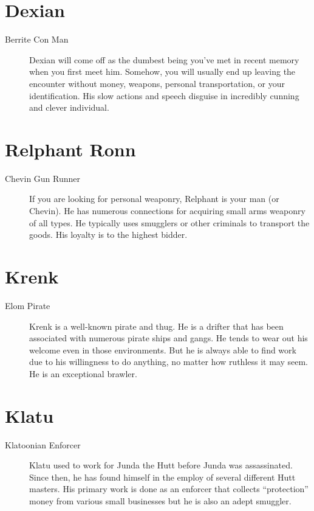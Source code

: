 \documentclass{article}
\begin{document}
\section{Dexian}
\begin{description}
	\item [Berrite \male Con Man] Dexian will come off as the dumbest being you’ve met in recent memory when you first meet him. Somehow, you will usually end up leaving the encounter without money, weapons, personal transportation, or your identification. His slow actions and speech disguise in incredibly cunning and clever individual.
\end{description}
\section{Relphant Ronn}
\begin{description}
	\item [Chevin \male Gun Runner] If you are looking for personal weaponry, Relphant is your man (or Chevin). He has numerous connections for acquiring small arms weaponry of all types. He typically uses smugglers or other criminals to transport the goods. His loyalty is to the highest bidder.
\end{description}
\section{Krenk}
\begin{description}
	\item [Elom \male Pirate] Krenk is a well-known pirate and thug. He is a drifter that has been associated with numerous pirate ships and gangs. He tends to wear out his welcome even in those environments. But he is always able to find work due to his willingness to do anything, no matter how ruthless it may seem. He is an exceptional brawler.
\end{description}
\section{Klatu}
\begin{description}
	\item [Klatoonian \male Enforcer] Klatu used to work for Junda the Hutt before Junda was assassinated. Since then, he has found himself in the employ of several different Hutt masters. His primary work is done as an enforcer that collects “protection” money from various small businesses but he is also an adept smuggler.
\end{description}
\end{document}
